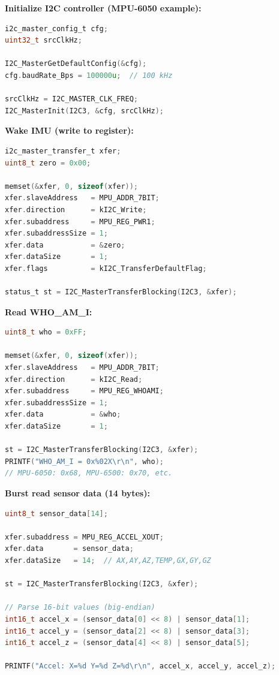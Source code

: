 \documentclass[12pt,a4paper]{report}
\begin{document}

\textbf{Initialize I2C controller (MPU-6050 example):}
\begin{lstlisting}[language=c]
i2c_master_config_t cfg;
uint32_t srcClkHz;

I2C_MasterGetDefaultConfig(&cfg);
cfg.baudRate_Bps = 100000u;  // 100 kHz

srcClkHz = I2C_MASTER_CLK_FREQ;
I2C_MasterInit(I2C3, &cfg, srcClkHz);
\end{lstlisting}

\textbf{Wake IMU (write to register):}
\begin{lstlisting}[language=c]
i2c_master_transfer_t xfer;
uint8_t zero = 0x00;

memset(&xfer, 0, sizeof(xfer));
xfer.slaveAddress   = MPU_ADDR_7BIT;
xfer.direction      = kI2C_Write;
xfer.subaddress     = MPU_REG_PWR1;
xfer.subaddressSize = 1;
xfer.data           = &zero;
xfer.dataSize       = 1;
xfer.flags          = kI2C_TransferDefaultFlag;

status_t st = I2C_MasterTransferBlocking(I2C3, &xfer);
\end{lstlisting}

\textbf{Read WHO\_AM\_I:}
\begin{lstlisting}[language=c]
uint8_t who = 0xFF;

memset(&xfer, 0, sizeof(xfer));
xfer.slaveAddress   = MPU_ADDR_7BIT;
xfer.direction      = kI2C_Read;
xfer.subaddress     = MPU_REG_WHOAMI;
xfer.subaddressSize = 1;
xfer.data           = &who;
xfer.dataSize       = 1;

st = I2C_MasterTransferBlocking(I2C3, &xfer);
PRINTF("WHO_AM_I = 0x%02X\r\n", who);
// MPU-6050: 0x68, MPU-6500: 0x70, etc.
\end{lstlisting}

\textbf{Burst read sensor data (14 bytes):}
\begin{lstlisting}[language=c]
uint8_t sensor_data[14];

xfer.subaddress = MPU_REG_ACCEL_XOUT;
xfer.data       = sensor_data;
xfer.dataSize   = 14;  // AX,AY,AZ,TEMP,GX,GY,GZ

st = I2C_MasterTransferBlocking(I2C3, &xfer);

// Parse 16-bit values (big-endian)
int16_t accel_x = (sensor_data[0] << 8) | sensor_data[1];
int16_t accel_y = (sensor_data[2] << 8) | sensor_data[3];
int16_t accel_z = (sensor_data[4] << 8) | sensor_data[5];

PRINTF("Accel: X=%d Y=%d Z=%d\r\n", accel_x, accel_y, accel_z);
\end{lstlisting}
\end{document}
